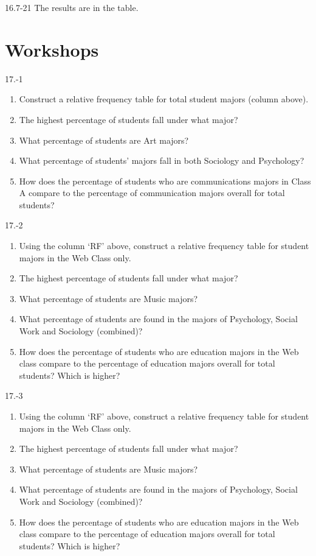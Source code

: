 \begin{exsol@solution}{16.7-21}
  The results are in the table.


\end{exsol@solution}
\setcounter{chapter}{16}\chapter{Workshops}
\begin{exsol@solution}{17.-1}

  \begin{enumerate}
  \item Construct a relative frequency table for total student majors (column above).
  \item	The highest percentage of students fall under what major?
  \item	What percentage of students are Art majors?
  \item	What percentage of  students’ majors fall in both Sociology and Psychology?
  \item	How does the percentage of students who are communications majors in Class A compare to the percentage of communication majors overall for total students?
\end{enumerate}

\end{exsol@solution}
\begin{exsol@solution}{17.-2}
  \begin{enumerate}
  \item	Using the column `RF' above, construct a relative frequency table for student majors in the Web Class only.
  \item	The highest percentage of students fall under what major?
  \item	What percentage of students are Music majors?
  \item	What percentage of students are found in the majors of Psychology, Social Work and Sociology (combined)?
  \item	How does the percentage of students who are education majors in the Web class compare to the percentage of education majors overall for total students?  Which is higher?
\end{enumerate}
\end{exsol@solution}
\begin{exsol@solution}{17.-3}
  \begin{enumerate}
  \item	Using the column `RF' above, construct a relative frequency table for student majors in the Web Class only.
  \item	The highest percentage of students fall under what major?
  \item	What percentage of students are Music majors?
  \item	What percentage of students are found in the majors of Psychology, Social Work and Sociology (combined)?
  \item	How does the percentage of students who are education majors in the Web class compare to the percentage of education majors overall for total students?  Which is higher?
\end{enumerate}

\end{exsol@solution}
